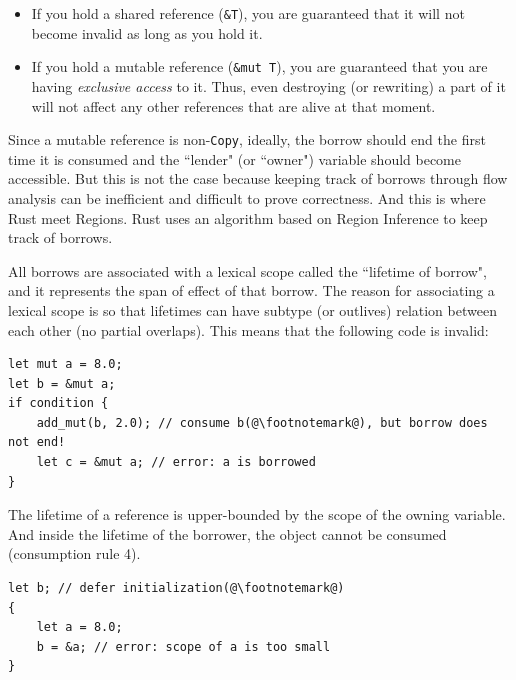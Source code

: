 \documentclass[11pt]{report}
\begin{document}
\begin{itemize}
\item If you hold a shared reference (\texttt{\&T}), you are guaranteed that it will not become invalid as long as you hold it.\footnotemark
\item If you hold a mutable reference (\texttt{\&mut T}), you are guaranteed that you are having \textit{exclusive access} to it. Thus, even destroying (or rewriting) a part of it will not affect any other references that are alive at that moment.
\end{itemize}

Since a mutable reference is non-\texttt{Copy}, ideally, the borrow should end the first time it is consumed and the ``lender" (or ``owner") variable should become accessible. But this is not the case because keeping track of borrows through flow analysis can be inefficient and difficult to prove correctness. And this is where Rust meet Regions. Rust uses an algorithm based on Region Inference to keep track of borrows.

All borrows are associated with a lexical scope called the ``lifetime of borrow", and it represents the span of effect of that borrow. The reason for associating a lexical scope is so that lifetimes can have subtype (or outlives) relation between each other (no partial overlaps). This means that the following code is invalid:

\begin{lstlisting}
let mut a = 8.0;
let b = &mut a;
if condition {
    add_mut(b, 2.0); // consume b(@\footnotemark@), but borrow does not end!
    let c = &mut a; // error: a is borrowed
}
\end{lstlisting}

The lifetime of a reference is upper-bounded by the scope of the owning variable. And inside the lifetime of the borrower, the object cannot be consumed (consumption rule 4).

\begin{lstlisting}
let b; // defer initialization(@\footnotemark@)
{
    let a = 8.0;
    b = &a; // error: scope of a is too small
}
\end{lstlisting}
\end{document}
